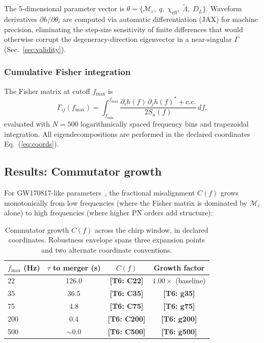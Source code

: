 \documentclass[twocolumn,prd,showpacs,superscriptaddress]{revtex4-2}
\newcommand{\Mchirp}{\mathcal{M}_c}
\newcommand{\Lambdatilde}{\tilde{\Lambda}}
\newcommand{\chieff}{\chi_{\text{eff}}}
\newcommand{\Dl}{D_L}
\newcommand{\fmin}{f_{\text{min}}}
\newcommand{\manifest}[1]{\textbf{[#1]}}
\newcommand{\secref}[1]{Sec.~\ref{sec:#1}}
\newcommand{\eqnref}[1]{Eq.~(\ref{eq:#1})}
\begin{document}
The 5-dimensional parameter vector is $\theta = \{\Mchirp,\; q,\; \chieff,\; \Lambdatilde,\; \Dl\}$. Waveform derivatives $\partial h/\partial\theta_i$ are computed via automatic differentiation (JAX) for machine precision, eliminating the step-size sensitivity of finite differences that would otherwise corrupt the degeneracy-direction eigenvector in a near-singular $\Gamma$ (\secref{validity}).

\subsubsection{Cumulative Fisher integration}

The Fisher matrix at cutoff $f_{\max}$ is
\begin{equation}
\Gamma_{ij}(f_{\max}) = \int_{\fmin}^{f_{\max}} \frac{\partial_i h(f)\,\partial_j h(f)^{*} + \text{c.c.}}{2 S_n(f)}\,df,
\label{eq:fisher_integral}
\end{equation}
evaluated with $N=500$ logarithmically spaced frequency bins and trapezoidal integration. All eigendecompositions are performed in the declared coordinates \eqnref{coords}.

\subsection{Results: Commutator growth}

For GW170817-like parameters~\cite{abbott2017gw170817}, the fractional misalignment $C(f)$ grows monotonically from low frequencies (where the Fisher matrix is dominated by $\Mchirp$ alone) to high frequencies (where higher PN orders add structure):

\begin{table}[tp]
\centering
\renewcommand{\arraystretch}{1.2}
\caption{Commutator growth $C(f)$ across the chirp window, in declared coordinates. Robustness envelope spans three expansion points and two alternate coordinate conventions.}
\label{tab:commutator_growth}
\begin{tabular}{lccc}
\toprule
$f_{\max}$ (Hz) & $\tau$ to merger (s) & $C(f)$ & Growth factor \\
\midrule
22 & 126.0 & \manifest{T6: C22} & $1.00\times$ (baseline) \\
35 & 36.5 & \manifest{T6: C35} & \manifest{T6: g35} \\
75 & 4.8 & \manifest{T6: C75} & \manifest{T6: g75} \\
200 & 0.4 & \manifest{T6: C200} & \manifest{T6: g200} \\
500 & $\sim0.0$ & \manifest{T6: C500} & \manifest{T6: g500} \\
\bottomrule
\end{tabular}
\end{table}
\end{document}
